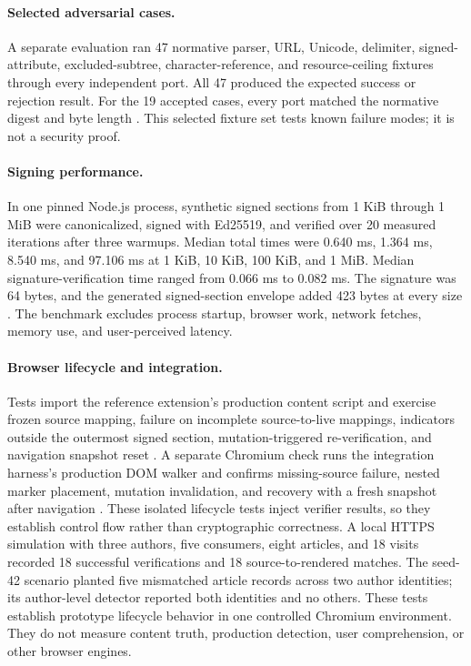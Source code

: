 \documentclass{article}
\begin{document}
\paragraph{Selected adversarial cases.} A separate evaluation ran 47 normative parser, URL, Unicode, delimiter, signed-attribute, excluded-subtree, character-reference, and resource-ceiling fixtures through every independent port. All 47 produced the expected success or rejection result. For the 19 accepted cases, every port matched the normative digest and byte length \cite{HTMLTrustStudy1}. This selected fixture set tests known failure modes; it is not a security proof.

\paragraph{Signing performance.} In one pinned Node.js process, synthetic signed sections from 1 KiB through 1 MiB were canonicalized, signed with Ed25519, and verified over 20 measured iterations after three warmups. Median total times were 0.640 ms, 1.364 ms, 8.540 ms, and 97.106 ms at 1 KiB, 10 KiB, 100 KiB, and 1 MiB. Median signature-verification time ranged from 0.066 ms to 0.082 ms. The signature was 64 bytes, and the generated signed-section envelope added 423 bytes at every size \cite{HTMLTrustStudy1}. The benchmark excludes process startup, browser work, network fetches, memory use, and user-perceived latency.

\paragraph{Browser lifecycle and integration.} Tests import the reference extension's production content script and exercise frozen source mapping, failure on incomplete source-to-live mappings, indicators outside the outermost signed section, mutation-triggered re-verification, and navigation snapshot reset \cite{HTMLTrustBrowserReference}. A separate Chromium check runs the integration harness's production DOM walker and confirms missing-source failure, nested marker placement, mutation invalidation, and recovery with a fresh snapshot after navigation \cite{HTMLTrustE2E}. These isolated lifecycle tests inject verifier results, so they establish control flow rather than cryptographic correctness. A local HTTPS simulation with three authors, five consumers, eight articles, and 18 visits recorded 18 successful verifications and 18 source-to-rendered matches. The seed-42 scenario planted five mismatched article records across two author identities; its author-level detector reported both identities and no others. These tests establish prototype lifecycle behavior in one controlled Chromium environment. They do not measure content truth, production detection, user comprehension, or other browser engines.
\end{document}
